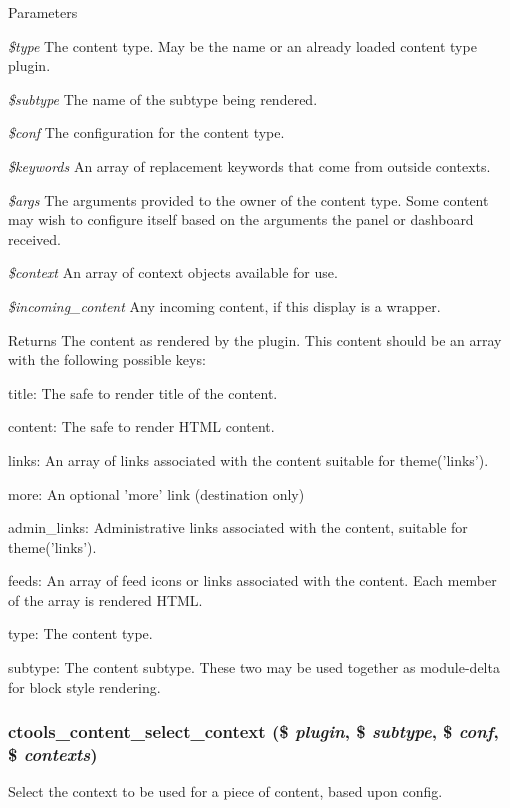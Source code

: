\begin{DoxyParams}{Parameters}
\item[{\em \$type}]The content type. May be the name or an already loaded content type plugin. \item[{\em \$subtype}]The name of the subtype being rendered. \item[{\em \$conf}]The configuration for the content type. \item[{\em \$keywords}]An array of replacement keywords that come from outside contexts. \item[{\em \$args}]The arguments provided to the owner of the content type. Some content may wish to configure itself based on the arguments the panel or dashboard received. \item[{\em \$context}]An array of context objects available for use. \item[{\em \$incoming\_\-content}]Any incoming content, if this display is a wrapper.\end{DoxyParams}
\begin{DoxyReturn}{Returns}
The content as rendered by the plugin. This content should be an array with the following possible keys:
\begin{DoxyItemize}
\item title: The safe to render title of the content.
\item content: The safe to render HTML content.
\item links: An array of links associated with the content suitable for theme('links').
\item more: An optional 'more' link (destination only)
\item admin\_\-links: Administrative links associated with the content, suitable for theme('links').
\item feeds: An array of feed icons or links associated with the content. Each member of the array is rendered HTML.
\item type: The content type.
\item subtype: The content subtype. These two may be used together as module-\/delta for block style rendering. 
\end{DoxyItemize}
\end{DoxyReturn}
\hypertarget{content_8inc_a5d850254c7e33ba6b215841e1839eae5}{
\subsubsection[{ctools\_\-content\_\-select\_\-context}]{\setlength{\rightskip}{0pt plus 5cm}ctools\_\-content\_\-select\_\-context (\$ {\em plugin}, \/  \$ {\em subtype}, \/  \$ {\em conf}, \/  \$ {\em contexts})}}
\label{content_8inc_a5d850254c7e33ba6b215841e1839eae5}
Select the context to be used for a piece of content, based upon config.


